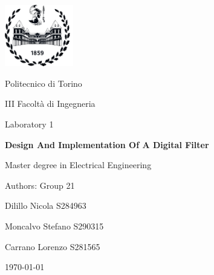\documentclass[11pt,  english, makeidx, a4paper, titlepage, oneside]{book}
\begin{document}
\frontmatter
\begin{titlepage}
\vspace{2cm}
\centerline{
\includegraphics[width=3cm]{./logopoli_new.png}} 
\vspace{0.5cm}
\centerline{\LARGE Politecnico di Torino}
\bigskip
\centerline{\Large III Facolt\`a di Ingegneria}
\vspace{3.5cm}
\centerline{\Huge\sf Laboratory 1}
\bigskip
\centerline{\Huge\bfseries\sf Design And Implementation Of A Digital Filter}
\vspace{2cm}
\centerline{\LARGE Master degree in Electrical Engineering}
\vspace{4cm}
%
\centerline{\Large Authors: Group 21}
\vspace{2cm}
%
%
\centerline{Dilillo Nicola S284963}
\centerline{Moncalvo Stefano S290315}
\centerline{Carrano Lorenzo S281565}
%
\vspace{1cm}
\centerline{\today}
\vspace{1cm}
\end{titlepage}

\tableofcontents

% 
\mainmatter
\lstset{language=VHDL}

%    
%



% 
%
%    
%
%
%
%
 
\end{document}

